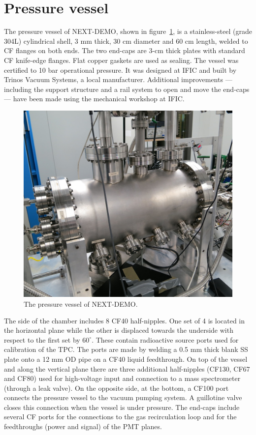 \section{Pressure vessel} \label{sec:PressureVessel}
The pressure vessel of NEXT-DEMO, shown in figure~\ref{fig:Vessel}, is a stainless-steel (grade 304L) cylindrical shell, 3 mm thick, 30 cm diameter and 60 cm length, welded to CF flanges on both ends. The two end-caps are 3-cm thick plates with standard CF knife-edge flanges. Flat copper gaskets are used as sealing. The vessel was certified to 10 bar operational pressure. It was designed at IFIC and built by Trinos Vacuum Systems, a local manufacturer. Additional improvements --- including the support structure and a rail system to open and move the end-caps --- have been made using the mechanical workshop at IFIC.

\begin{figure}
\centering
\includegraphics[scale=0.9]{img/VesselCloseup.jpg}
\caption{The pressure vessel of NEXT-DEMO.} \label{fig:Vessel}
\end{figure}

The side of the chamber includes 8 CF40 half-nipples. One set of 4 is located in the horizontal plane while the other is displaced towards the underside with respect to the first set by $60^\circ$. These contain radioactive source ports used for calibration of the TPC. The ports are made by welding a 0.5 mm thick blank SS plate onto a 12 mm OD pipe on a CF40 liquid feedthrough. On top of the vessel and along the vertical plane there are three additional half-nipples (CF130, CF67 and CF80) used for high-voltage input and connection to a mass spectrometer (through a leak valve). On the opposite side, at the bottom, a CF100 port connects the pressure vessel to the vacuum pumping system. A guillotine valve closes this connection when the vessel is under pressure. The end-caps include several CF ports for the connections to the gas recirculation loop and for the feedthroughs (power and signal) of the PMT planes.
